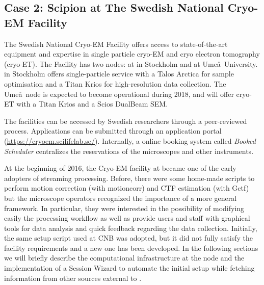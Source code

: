 
\subsection{Case 2: Scipion at The Swedish National Cryo-EM Facility}

The Swedish National Cryo-EM Facility offers access to state-of-the-art equipment and expertise in single particle cryo-EM and cryo electron tomography (cryo-ET). The Facility has two nodes: at \scilifelab in Stockholm and at Ume\aa\ University. \scilifelab in Stockholm offers single-particle service with a 
Talos Arctica for sample optimisation and a Titan Krios for high-resolution data collection. The Ume\aa\ node is expected to become operational during 2018, and will offer cryo-ET with a Titan Krios and a Scios DualBeam SEM.

The facilities can be accessed by Swedish researchers through 
a peer-reviewed process. Applications can be submitted through an application portal (\url{https://cryoem.scilifelab.se/}). %
Internally, a online booking system called \emph{Booked Scheduler} centralizes the reservations of the microscopes and other instruments. 

At the beginning of 2016, the Cryo-EM facility at \scilifelab became one of the early adopters of \scipion streaming processing. Before, there were some home-made scripts to perform motion correction (with motioncorr) and CTF estimation (with Gctf) but the microscope operators recognized the importance of a more general framework. In particular, they were interested in the possibility of modifying easily the processing workflow as well as provide users and staff with  graphical tools for data analysis and quick feedback regarding the data collection. Initially, the same setup script used at CNB was adopted, but it did not fully satisfy the facility requirements and a new one has been developed. In the following sections we will briefly describe the computational infrastructure at the \scilifelab node and the implementation of a Session Wizard to automate the initial setup while fetching information from other sources external to \scipion. 

